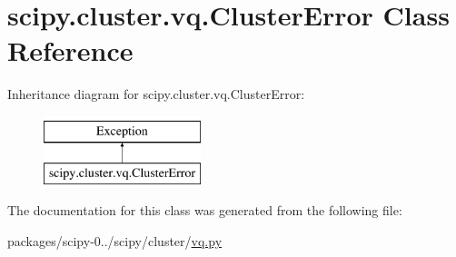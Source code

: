 \hypertarget{classscipy_1_1cluster_1_1vq_1_1ClusterError}{}\section{scipy.\+cluster.\+vq.\+Cluster\+Error Class Reference}
\label{classscipy_1_1cluster_1_1vq_1_1ClusterError}
Inheritance diagram for scipy.\+cluster.\+vq.\+Cluster\+Error\+:\begin{figure}[H]
\begin{center}
\leavevmode
\includegraphics[height=2.000000cm]{classscipy_1_1cluster_1_1vq_1_1ClusterError}
\end{center}
\end{figure}


The documentation for this class was generated from the following file\+:\begin{DoxyCompactItemize}
\item 
packages/scipy-\/0../scipy/cluster/\hyperlink{cluster_2vq_8py}{vq.\+py}\end{DoxyCompactItemize}
